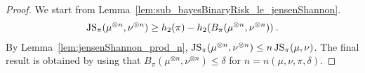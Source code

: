 \begin{proof}%
{}
We start from Lemma~\ref{lem:sub_bayesBinaryRisk_le_jensenShannon}.
\begin{align*}
\operatorname{JS}_\pi(\mu^{\otimes n}, \nu^{\otimes n}) \ge h_2(\pi) - h_2(B_\pi(\mu^{\otimes n}, \nu^{\otimes n})) \: .
\end{align*}
By Lemma~\ref{lem:jensenShannon_prod_n}, $\operatorname{JS}_\pi(\mu^{\otimes n}, \nu^{\otimes n}) \le n \operatorname{JS}_\pi(\mu, \nu)$. The final result is obtained by using that $B_\pi(\mu^{\otimes n}, \nu^{\otimes n}) \le \delta$ for $n = n(\mu, \nu, \pi, \delta)$.
\end{proof}
